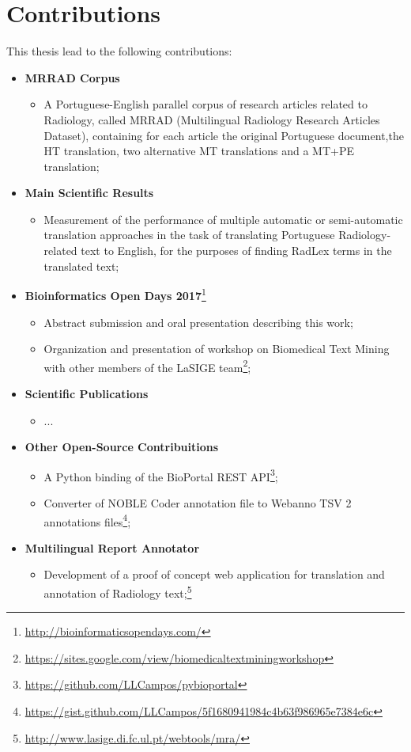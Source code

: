 \section{Contributions}

This thesis lead to the following contributions: 

\begin{itemize}

\item \textbf{MRRAD Corpus}
	\begin{itemize}
		\item A Portuguese-English parallel corpus of research articles related to Radiology, called MRRAD (Multilingual Radiology Research Articles Dataset), containing for each article the original Portuguese document,the HT translation, two alternative MT translations and a MT+PE translation;
	\end{itemize}
	
\item \textbf{Main Scientific Results}
	\begin{itemize}
		\item Measurement of the performance of multiple automatic or semi-automatic translation approaches in the task of translating Portuguese Radiology-related text to English, for the purposes of finding RadLex terms in the translated text;
	\end{itemize}

\item \textbf{Bioinformatics Open Days 2017}\footnote{\url{http://bioinformaticsopendays.com/}}
	\begin{itemize}
	\item Abstract submission and oral presentation describing this work;
	\item Organization and presentation of workshop on Biomedical Text Mining with other members of the LaSIGE team\footnote{\url{https://sites.google.com/view/biomedicaltextminingworkshop}};
	\end{itemize}
	
\item \textbf{Scientific Publications}
	\begin{itemize}
		\item ...
	\end{itemize}
	
\item \textbf{Other Open-Source Contribuitions}
	\begin{itemize}
		\item A Python binding of the BioPortal REST API\footnote{\url{https://github.com/LLCampos/pybioportal}};
		\item Converter of NOBLE Coder annotation file to Webanno TSV 2 annotations files\footnote{\url{https://gist.github.com/LLCampos/5f1680941984c4b63f986965e7384e6c}};
	\end{itemize}
	
\item \textbf{Multilingual Report Annotator}
	\begin{itemize}
		\item Development of a proof of concept web application for translation and annotation of Radiology text;\footnote{\url{http://www.lasige.di.fc.ul.pt/webtools/mra/}}
	\end{itemize}
	 
\end{itemize}


